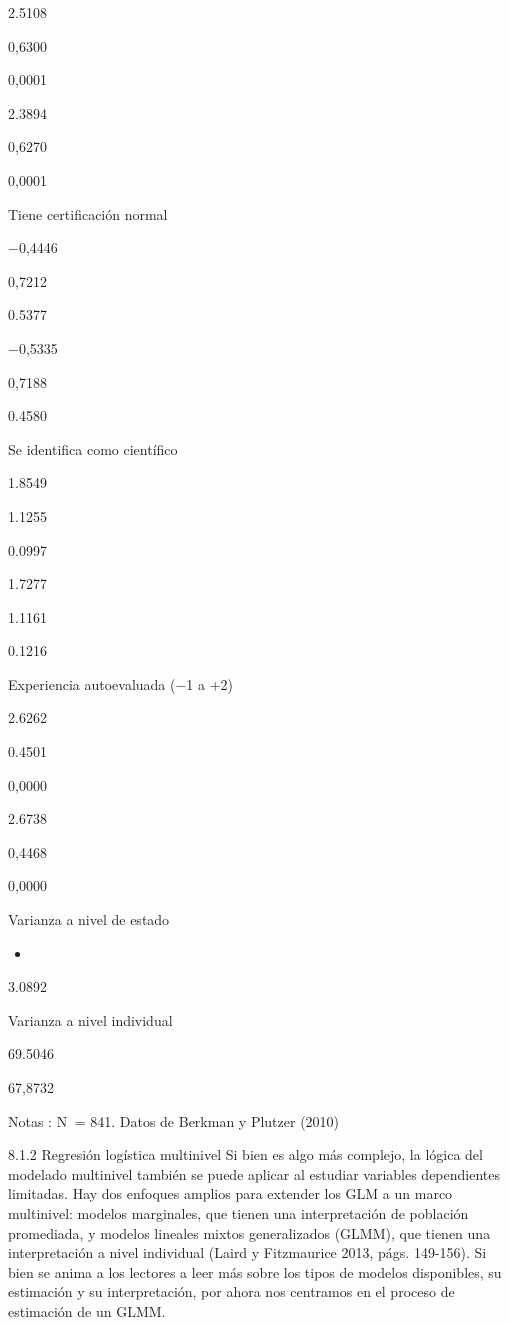 \documentclass[
]{book}
\providecommand{\tightlist}{%
  \setlength{\itemsep}{0pt}\setlength{\parskip}{0pt}}
\begin{document}
2.5108

0,6300

0,0001

2.3894

0,6270

0,0001

Tiene certificación normal

−0,4446

0,7212

0.5377

−0,5335

0,7188

0.4580

Se identifica como científico

1.8549

1.1255

0.0997

1.7277

1.1161

0.1216

Experiencia autoevaluada (−1 a +2)

2.6262

0.4501

0,0000

2.6738

0,4468

0,0000

Varianza a nivel de estado

\begin{itemize}
\tightlist
\item
\end{itemize}

3.0892

Varianza a nivel individual

69.5046

67,8732

Notas : N  = 841. Datos de Berkman y Plutzer (2010)

8.1.2 Regresión logística multinivel
Si bien es algo más complejo, la lógica del modelado multinivel también se puede aplicar al estudiar variables dependientes limitadas. Hay dos enfoques amplios para extender los GLM a un marco multinivel: modelos marginales, que tienen una interpretación de población promediada, y modelos lineales mixtos generalizados (GLMM), que tienen una interpretación a nivel individual (Laird y Fitzmaurice 2013, págs. 149-156). Si bien se anima a los lectores a leer más sobre los tipos de modelos disponibles, su estimación y su interpretación, por ahora nos centramos en el proceso de estimación de un GLMM.
\end{document}
